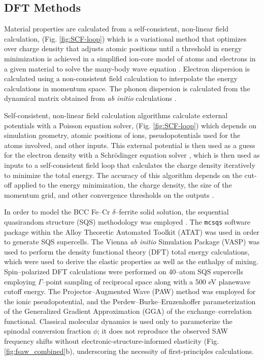 \documentclass[final,3p,times]{elsarticle}
\begin{document}
\subsection{DFT Methods}
Material properties are calculated from a self-consistent, non-linear field calculation, (Fig. \ref{fig:SCF-loop}) which is a variational method that optimizes over charge density that adjusts atomic positions until a threshold in energy minimization is achieved in a simplified ion-core model of atoms and electrons in a given material to solve the many-body wave equation \cite{Schwingenschloegl2004}. Electron dispersion is calculated using a non-consistent field calculation to interpolate the energy calculations in momentum space. The phonon dispersion is calculated from the dynamical matrix obtained from \textit{ab initio} calculations \cite{hung2022quantum, giustino2014materials}.

Self-consistent, non-linear field calculation algorithms calculate external potentials with a Poisson equation solver, (Fig. \ref{fig:SCF-loop}) which depends on simulation geometry, atomic positions of ions, pseudopotentials used for the atoms involved, and other inputs. This external potential is then used as a guess for the electron density with a Schr\"{o}dinger equation solver \cite{giustino2014materials}, which is then used as inputs to a self-consistent field loop that calculates the charge density iteratively to minimize the total energy. The accuracy of this algorithm depends on the cut-off applied to the energy minimization, the charge density, the size of the momentum grid, and other convergence thresholds on the outputs \cite{hung2022quantum, Schwingenschloegl2004, giustino2014materials}.

In order to model the BCC Fe--Cr $\delta$--ferrite solid solution, the sequential quasirandom structure (SQS) methodology was employed \cite{VandeWalleLiu2013}. 
The \texttt{mcsqs} software package within the Alloy Theoretic Automated Toolkit (ATAT) was used in order to generate SQS supercells.
The Vienna \textit{ab initio} Simulation Package (VASP) was used to perform the density functional theory (DFT) total energy calculations, which were used to derive the elastic properties as well as the enthalpy of mixing. 
Spin--polarized DFT calculations were performed on 40--atom SQS supercells employing $\Gamma$--point sampling of reciprocal space along with a 500 eV planewave cutoff energy. 
The Projector--Augmented Wave (PAW) method was employed for the ionic pseudopotential, and the Perdew--Burke--Ernzenhoffer parameterization of the Generalized Gradient Approximation (GGA) of the exchange--correlation functional. Classical molecular dynamics is used only to parameterize the spinodal conversion fraction $\phi$; it does not reproduce the observed SAW frequency shifts without electronic-structure-informed elasticity (Fig. \ref{fig:fsaw_combined}b), underscoring the necessity of first-principles calculations.
\end{document}
